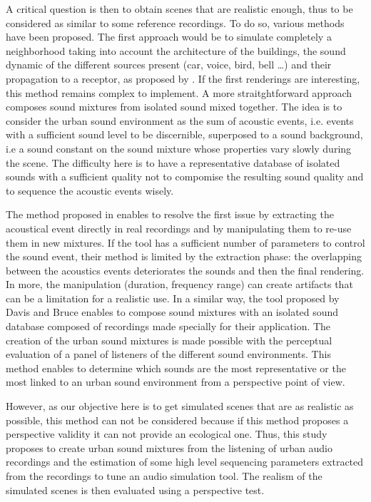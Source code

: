 \documentclass[a4,11pt,twocolumn]{article}
\begin{document}
A critical question is then to obtain scenes that are realistic enough, thus to be considered as similar to some reference recordings. To do so, various methods have been proposed. The first approach would be to simulate completely a neighborhood taking into account the architecture of the buildings, the sound dynamic of the different sources present (car, voice, bird, bell \dots) and their propagation to a receptor, as proposed by \cite{cstb_simulation_2015}. If the first renderings are interesting, this method remains complex to implement.
A more straitghtforward approach composes sound mixtures from isolated sound mixed together. The idea is to consider the urban sound environment as the sum of acoustic events, i.e. events with a sufficient sound level to be discernible, superposed to a sound background, i.e a sound constant on the sound mixture whose properties vary slowly during the scene. The difficulty here is to have a representative database of isolated sounds with a sufficient quality not to compomise the resulting sound quality and to sequence the acoustic events wisely.

The method proposed in \cite{misra_musical_2007} enables to resolve the first issue by extracting the acoustical event directly in real recordings and by manipulating them to re-use them in new mixtures. If the tool has a sufficient number of parameters to control the sound event, their method is limited by the extraction phase: the overlapping between the acoustics events deteriorates the sounds and then the final rendering. In more, the manipulation (duration, frequency range) can create artifacts that can be a limitation for a realistic use. In a similar way, the tool proposed by Davis and Bruce \cite{bruce_development_2009} enables to compose sound mixtures with an isolated sound database composed of recordings made specially for their application. The creation of the urban sound mixtures is made possible with the perceptual evaluation of a panel of listeners of the different sound environments. This method enables to determine which sounds are the most representative or the most linked to an urban sound environment from a perspective point of view.

However, as our objective here is to get simulated scenes that are as realistic as possible, this method can not be considered because if this method proposes a perspective validity it can not provide an ecological one. Thus, this study proposes to create urban sound mixtures from the listening of urban audio recordings and the estimation of some high level sequencing parameters extracted from the recordings to tune an audio simulation tool. The realism of the simulated scenes is then evaluated using a perspective test.
\end{document}
